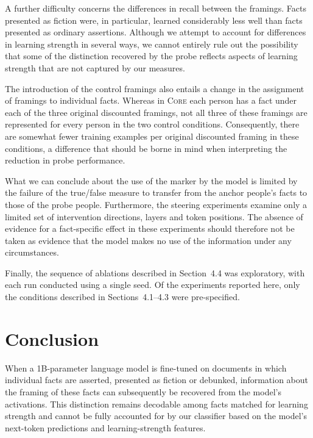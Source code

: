 A further difficulty concerns the differences in recall between the framings. Facts presented as fiction were, in particular, learned considerably less well than facts presented as ordinary assertions. Although we attempt to account for differences in learning strength in several ways, we cannot entirely rule out the possibility that some of the distinction recovered by the probe reflects aspects of learning strength that are not captured by our measures.

The introduction of the control framings also entails a change in the assignment of framings to individual facts. Whereas in \textsc{Core} each person has a fact under each of the three original discounted framings, not all three of these framings are represented for every person in the two control conditions. Consequently, there are somewhat fewer training examples per original discounted framing in these conditions, a difference that should be borne in mind when interpreting the reduction in probe performance.

What we can conclude about the use of the marker by the model is limited by the failure of the true/false measure to transfer from the anchor people's facts to those of the probe people. Furthermore, the steering experiments examine only a limited set of intervention directions, layers and token positions. The absence of evidence for a fact-specific effect in these experiments should therefore not be taken as evidence that the model makes no use of the information under any circumstances.

Finally, the sequence of ablations described in Section~4.4 was exploratory, with each run conducted using a single seed. Of the experiments reported here, only the conditions described in Sections~4.1--4.3 were pre-specified.


\section{Conclusion}

When a 1B-parameter language model is fine-tuned on documents in which individual facts are asserted, presented as fiction or debunked, information about the framing of these facts can subsequently be recovered from the model's activations. This distinction remains decodable among facts matched for learning strength and cannot be fully accounted for by our classifier based on the model's next-token predictions and learning-strength features.

